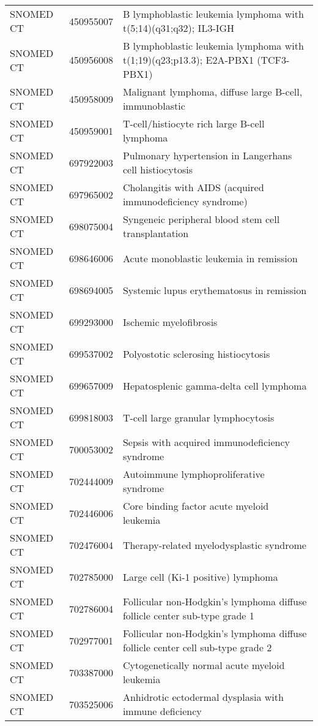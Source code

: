 \begin{table}[ht]
\begin{tabular}{lll}
  SNOMED CT & 450955007 & B lymphoblastic leukemia lymphoma with t(5;14)(q31;q32); IL3-IGH \\ 
  SNOMED CT & 450956008 & B lymphoblastic leukemia lymphoma with t(1;19)(q23;p13.3); E2A-PBX1 (TCF3-PBX1) \\ 
  SNOMED CT & 450958009 & Malignant lymphoma, diffuse large B-cell, immunoblastic \\ 
  SNOMED CT & 450959001 & T-cell/histiocyte rich large B-cell lymphoma \\ 
  SNOMED CT & 697922003 & Pulmonary hypertension in Langerhans cell histiocytosis \\ 
  SNOMED CT & 697965002 & Cholangitis with AIDS (acquired immunodeficiency syndrome) \\ 
  SNOMED CT & 698075004 & Syngeneic peripheral blood stem cell transplantation \\ 
  SNOMED CT & 698646006 & Acute monoblastic leukemia in remission \\ 
  SNOMED CT & 698694005 & Systemic lupus erythematosus in remission \\ 
  SNOMED CT & 699293000 & Ischemic myelofibrosis \\ 
  SNOMED CT & 699537002 & Polyostotic sclerosing histiocytosis \\ 
  SNOMED CT & 699657009 & Hepatosplenic gamma-delta cell lymphoma \\ 
  SNOMED CT & 699818003 & T-cell large granular lymphocytosis \\ 
  SNOMED CT & 700053002 & Sepsis with acquired immunodeficiency syndrome \\ 
  SNOMED CT & 702444009 & Autoimmune lymphoproliferative syndrome \\ 
  SNOMED CT & 702446006 & Core binding factor acute myeloid leukemia \\ 
  SNOMED CT & 702476004 & Therapy-related myelodysplastic syndrome \\ 
  SNOMED CT & 702785000 & Large cell (Ki-1 positive) lymphoma \\ 
  SNOMED CT & 702786004 & Follicular non-Hodgkin's lymphoma diffuse follicle center sub-type grade 1 \\ 
  SNOMED CT & 702977001 & Follicular non-Hodgkin's lymphoma diffuse follicle center cell sub-type grade 2 \\ 
  SNOMED CT & 703387000 & Cytogenetically normal acute myeloid leukemia \\ 
  SNOMED CT & 703525006 & Anhidrotic ectodermal dysplasia with immune deficiency \\ 

\end{tabular}
\end{table}
